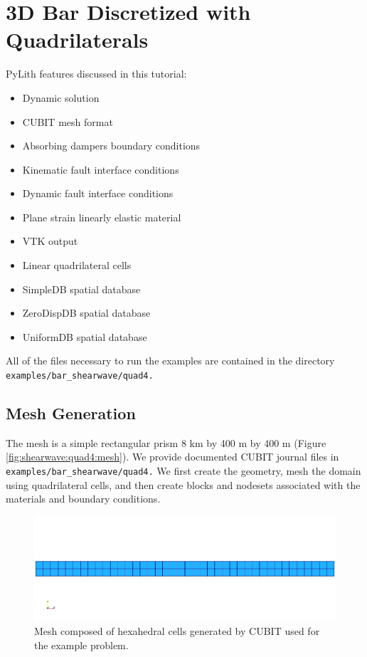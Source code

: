 
\section{\label{sec:tutorial:shearwave:quad4}3D Bar Discretized with Quadrilaterals}

PyLith features discussed in this tutorial:
\begin{itemize}
\item Dynamic solution
\item CUBIT mesh format
\item Absorbing dampers boundary conditions
\item Kinematic fault interface conditions
\item Dynamic fault interface conditions
\item Plane strain linearly elastic material
\item VTK output
\item Linear quadrilateral cells
\item SimpleDB spatial database
\item ZeroDispDB spatial database
\item UniformDB spatial database
\end{itemize}
All of the files necessary to run the examples are contained in the
directory \texttt{examples/bar\_shearwave/quad4.}


\subsection{Mesh Generation}

The mesh is a simple rectangular prism 8 km by 400 m by 400 m (Figure
\vref{fig:shearwave:quad4:mesh}). We provide documented CUBIT journal
files in \texttt{examples/bar\_shearwave/quad4.} We first create the
geometry, mesh the domain using quadrilateral cells, and then create
blocks and nodesets associated with the materials and boundary conditions.

\noindent \begin{center}
\begin{figure}
\begin{centering}
\includegraphics[scale=0.5]{tutorials/shearwave/figs/quad4mesh}
\par\end{centering}

\caption{Mesh composed of hexahedral cells generated by CUBIT used for the
example problem.\label{fig:shearwave:quad4:mesh}}
\end{figure}

\par\end{center}


